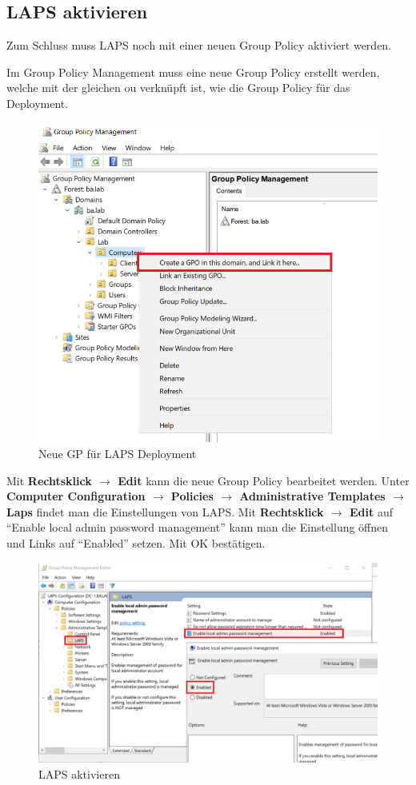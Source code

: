 \subsection{LAPS aktivieren}
Zum Schluss muss LAPS noch mit einer neuen Group Policy aktiviert werden.

Im Group Policy Management muss eine neue Group Policy erstellt werden, welche mit der gleichen \acrshort{ou} verknüpft ist, wie die Group Policy für das Deployment.
\begin{figure}[H]
    \centering
    \includegraphics[width=0.7\linewidth]{../img/LAPS/GPO-Create-New.png}
    \caption{Neue GP für LAPS Deployment}
\end{figure}

Mit \textbf{Rechtsklick $\rightarrow$ Edit} kann die neue Group Policy bearbeitet werden.
Unter \textbf{Computer Configuration $\rightarrow$ Policies $\rightarrow$ Administrative Templates $\rightarrow$ Laps} findet man die Einstellungen von LAPS.
Mit \textbf{Rechtsklick $\rightarrow$ Edit} auf ``Enable local admin password management'' kann man die Einstellung öffnen und Links auf ``Enabled'' setzen.
Mit OK bestätigen.
\begin{figure}[H]
    \centering
    \includegraphics[width=0.7\linewidth]{../img/LAPS/enable-laps.png}
    \caption{LAPS aktivieren}
\end{figure}

